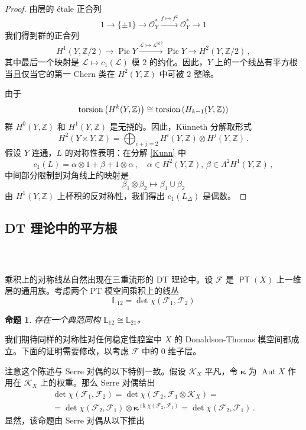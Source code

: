\documentclass[12pt]{article}
\newcommand{\Z}{\mathbb{Z}}
\newcommand{\cO}{\mathscr{O}}
\newcommand{\cL}{\mathscr{L}}
\DeclareMathOperator{\Aut}{Aut}
\DeclareMathOperator{\PT}{\mathsf{PT}}
\DeclareMathOperator{\Pic}{Pic}
\DeclareMathOperator{\rk}{rk}
\newcommand{\bL}{\mathbb{L}}
\newcommand{\cF}{\mathscr{F}}
\newcommand{\cK}{\mathscr{K}}
\newcommand{\bk}{\boldsymbol{\kappa}}
\newtheorem{Proposition}[Lemma]{命题}
\theoremstyle{definition}
\begin{document}
\begin{proof}
由层的 {\'e}tale 正合列
$$
1 \to \{\pm 1\} \to \cO_Y^* \xrightarrow{f\mapsto f^2} \cO_Y^* \to 1
$$
我们得到群的正合列
$$
H^1(Y,\Z/2) \to \Pic Y \xrightarrow{\cL\mapsto \cL^{\otimes 2}} \Pic Y
\to H^2(Y,\Z/2)\,,
$$
其中最后一个映射是 $\cL \mapsto c_1(\cL)$ 模 $2$ 的约化。因此，$Y$ 上的一个线丛有平方根当且仅当它的第一 Chern 类在 $H^2(Y,\Z)$ 中可被 $2$ 整除。

由于
$$
\textup{torsion} \left(H^k(Y,\Z)\right) \cong
\textup{torsion} \left(H_{k-1}(Y,\Z)\right)
$$
群 $H^0(Y,\Z)$ 和 $H^1(Y,\Z)$ 是无挠的。因此，Künneth 分解取形式
\begin{equation}
H^2(Y \times Y,\Z) = \bigoplus_{i+j=2} H^i(Y,\Z) \otimes H^j(Y,\Z) \,.
\label{Kunn}
\end{equation}
假设 $Y$ 连通，$L$ 的对称性表明：在分解 \eqref{Kunn} 中
$$
c_1(L) = \alpha \otimes 1 +  \beta + 1 \otimes \alpha\,, \quad
\alpha \in H^2(Y,\Z),\, \beta\in \Lambda^2 H^1(Y,\Z)\,,
$$
中间部分限制到对角线上的映射是
$$
\beta_1 \otimes \beta_2 \mapsto \beta_1 \cup \beta_2
$$
由 $H^1(Y,\Z)$ 上杯积的反对称性，我们得出 $c_1(L_{\Delta})$ 是偶数。
\end{proof}

\subsection{DT 理论中的平方根}

\subsubsection{\ }

乘积上的对称线丛自然出现在三重流形的 DT 理论中。设 $\cF$ 是 $\PT(X)$ 上一维层的通用族。考虑两个 PT 模空间乘积上的线丛
$$
\bL_{12} = \det \chi(\cF_1,\cF_2)
$$

\begin{Proposition}\label{p_symm}
存在一个典范同构 $\bL_{12} \cong \bL_{21}$。
\end{Proposition}

我们期待同样的对称性对任何稳定性腔室中 $X$ 的 Donaldson-Thomas 模空间都成立。下面的证明需要修改，以考虑 $\cF$ 中的 $0$ 维子层。

注意这个陈述与 Serre 对偶的以下特例一致。假设 $\cK_X$ 平凡，令 $\bk$ 为 $\Aut X$ 作用在 $\cK_X$ 上的权重。那么 Serre 对偶给出
\begin{multline}
   \det \chi(\cF_1,\cF_2) =  \det \chi(\cF_2,\cF_1 \otimes \cK_X) =\\
=  \det \chi(\cF_2,\cF_1) \otimes \bk^{\rk \chi(\cF_2,\cF_1)} =
\det \chi(\cF_2,\cF_1) \,.
\label{deghomchi}
\end{multline}
显然，该命题由 Serre 对偶从以下推出
\end{document}
